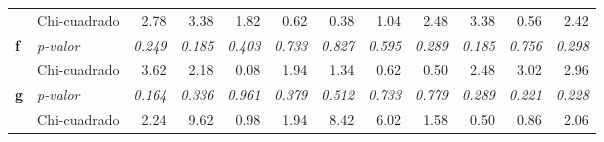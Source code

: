 \documentclass[mathematics,article,submit,moreauthors,pdftex]{mdpi}
\begin{document}
\begin{table}[H]
\begin{tabular}{llrrrrrrrrrr}
                                           & Chi-cuadrado                               & 2.78                                  & 3.38                                  & 1.82                                  & 0.62                                  & 0.38                                  & 1.04                                  & 2.48                                  & 3.38                                  & 0.56                                  & 2.42                                  \\ \cline{2-12} 
\multirow{-2}{*}{\textbf{f}}               & \textit{p-valor}                           & \textit{0.249}                        & \textit{0.185}                        & \textit{0.403}                        & \textit{0.733}                        & \textit{0.827}                        & \textit{0.595}                        & \textit{0.289}                        & \textit{0.185}                        & \textit{0.756}                        & \textit{0.298}                        \\ \hline
                                           & Chi-cuadrado                               & 3.62                                  & 2.18                                  & 0.08                                  & 1.94                                  & 1.34                                  & 0.62                                  & 0.50                                  & 2.48                                  & 3.02                                  & 2.96                                  \\ \cline{2-12} 
\multirow{-2}{*}{\textbf{g}}               & \textit{p-valor}                           & \textit{0.164}                        & \textit{0.336}                        & \textit{0.961}                        & \textit{0.379}                        & \textit{0.512}                        & \textit{0.733}                        & \textit{0.779}                        & \textit{0.289}                        & \textit{0.221}                        & \textit{0.228}                        \\ \hline
                                           & Chi-cuadrado                               & 2.24                                  & 9.62                                  & 0.98                                  & 1.94                                  & 8.42                                  & 6.02                                  & 1.58                                  & 0.50                                  & 0.86                                  & 2.06                                  \\ \cline{2-12} 

\end{tabular}
\end{table}
\end{document}
